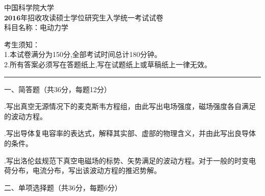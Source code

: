 \begin{center}
	\heiti
	\LARGE{ 中国科学院大学\\$\boldsymbol{2016}$年招收攻读硕士学位研究生入学统一考试试卷\\
	科目名称：电动力学}

\end{center}
\noindent
考生须知：\\
1.本试卷满分为150分,全部考试时间总计180分钟。\\
2.所有答案必须写在答题纸上,写在试题纸上或草稿纸上一律无效。

\vspace*{2ex}
\hrule
\vspace*{4ex}


\setcounter{page}{1}%
\pagestyle{mypagestyle}

\onehalfspacing

\vspace{0.4cm}

\noindent
一、简答题（共36分，每题12分）
\vspace{0.2cm}

.\hspace{0.8em}写出真空无源情况下的麦克斯韦方程组，由此写出电场强度，磁场强度各自满足的波动方程。\vspace{0.3cm}

.\hspace{0.8em}写出导体复电容率的表达式，解释其实部、虚部的物理含义，并由此写出良导体的条件。\vspace{0.3cm}

.\hspace{0.8em}写出洛伦兹规范下真空电磁场的标势、矢势满足的波动方程。对于一般的时变电荷分布，电流分布，写出该波动方程的推迟势解。\vspace{1cm}

\noindent
二、\hspace{0.2em}单项选择题（共36分，每题6分）
\vspace{0.2cm}

